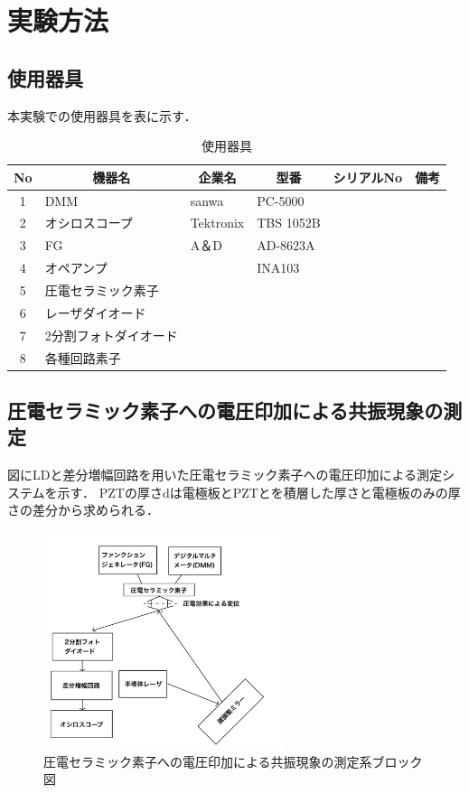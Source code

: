 \documentclass{ltjsarticle}
\begin{document}
\section{実験方法}
	\subsection{使用器具}
		本実験での使用器具を表に示す．
		\begin{table}[H]
		\begin{center}
		\caption{使用器具}
		\label{tab:used}
		\begin{tabular}{clllll} \toprule
		No&\multicolumn{1}{c}{機器名}&\multicolumn{1}{c}{企業名}&\multicolumn{1}{c}{型番}&\multicolumn{1}{c}{シリアルNo}&\multicolumn{1}{c}{備考}\\
		\hline
		1&DMM&sanwa&PC-5000&\\
		2&オシロスコープ&Tektronix&TBS 1052B&\\
		3&FG&A＆D&AD-8623A&\\
		4&オペアンプ&&INA103&\\
		5&圧電セラミック素子&&&\\
		6&レーザダイオード&&&\\
		7&2分割フォトダイオード&&&\\
		8&各種回路素子&&&\\
		\bottomrule
		\end{tabular}
		\end{center}
		\end{table}

	\subsection{圧電セラミック素子への電圧印加による共振現象の測定}
		図にLDと差分増幅回路を用いた圧電セラミック素子への電圧印加による測定システムを示す．
		PZTの厚さdは電極板とPZTとを積層した厚さと電極板のみの厚さの差分から求められる．
		\begin{figure}[H]
		\centering
		\includegraphics[width = 7cm]{figs/IMG_0321.JPG}
		\caption{圧電セラミック素子への電圧印加による共振現象の測定系ブロック図}
		\label{fig:圧電セラミック素子測定系}
		\end{figure}
\end{document}
